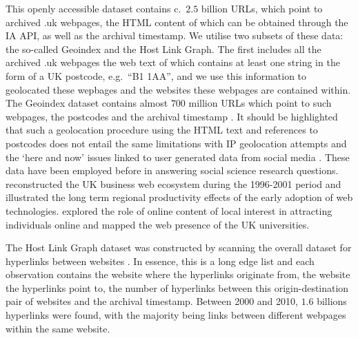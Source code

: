 \documentclass[]{interact}
\theoremstyle{plain}%
\theoremstyle{definition}
\theoremstyle{remark}
\begin{document}
This openly accessible dataset contains c.~\(2.5\) billion URLs, which
point to archived .uk webpages, the HTML content of which can be
obtained through the IA API, as well as the archival timestamp. We
utilise two subsets of these data: the so-called Geoindex and the Host
Link Graph. The first includes all the archived .uk webpages the web
text of which contains at least one string in the form of a UK postcode,
e.g.~``B1 1AA'', and we use this information to geolocated these
wepbages and the websites these webpages are contained within. The
Geoindex dataset contains almost \(700\) million URLs which point to
such webpages, the postcodes and the archival timestamp
\citep{BL2013geo}. It should be highlighted that such a geolocation
procedure using the HTML text and references to postcodes does not
entail the same limitations with IP geolocation attempts
\citep{zook2000web} and the `here and now' issues linked to user
generated data from social media \citep{geotag}. These data have been
employed before in answering social science research questions.
\citet{Musso2016} reconstructed the UK business web ecosystem during the
1996-2001 period and \citet{tranos2020digital} illustrated the long term
regional productivity effects of the early adoption of web technologies.
\citet{tranos2020individual} explored the role of online content of
local interest in attracting individuals online and \citet{Hale2014}
mapped the web presence of the UK universities.

The Host Link Graph dataset was constructed by scanning the overall
dataset for hyperlinks between websites \citep{BL2013links}. In essence,
this is a long edge list and each observation contains the website where
the hyperlinks originate from, the website the hyperlinks point to, the
number of hyperlinks between this origin-destination pair of websites
and the archival timestamp. Between 2000 and 2010, \(1.6\) billions
hyperlinks were found, with the majority being links between different
webpages within the same website.
\end{document}
